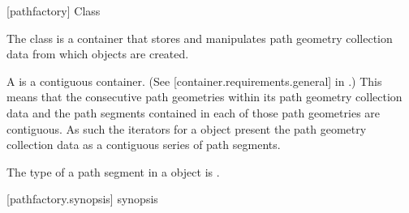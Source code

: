  [pathfactory] {Class }

\pnum
{}
The class  is a container that stores and manipulates path
geometry collection data from which  objects are created.

\pnum
A  is a contiguous container. (See [container.requirements.general] in \cppseventeen.) This means that the consecutive path geometries within its path geometry collection data and the path segments contained in each of those path geometries are contiguous. As such the iterators for a  object present the path geometry collection data as a contiguous series of path segments.

\pnum
The type of a path segment in a  object is  .

%
 [pathfactory.synopsis] { synopsis}

